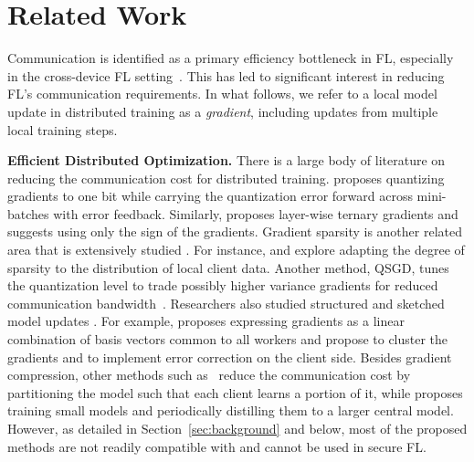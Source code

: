 \newcommand{\para}[1]{\noindent \textbf{#1}}

\section{Related Work}
\label{sec:related}

Communication is identified as a primary efficiency bottleneck in FL, especially in the cross-device FL setting~\cite{kairouz2019advances}.
This has led to significant interest in reducing FL's communication requirements. In what follows, we refer to a local model update in distributed training as a \emph{gradient}, including updates from multiple local training steps.

\para{Efficient Distributed Optimization.} There is a large body of literature on reducing the communication cost for distributed training. \cite{seide2014bit} proposes quantizing gradients to one bit while carrying the quantization error forward across mini-batches with error feedback. Similarly, \cite{wen2017terngrad} proposes layer-wise ternary gradients and \cite{bernstein2018signsgd} suggests using only the sign of the gradients. Gradient sparsity is another related area that is extensively studied \cite{wangni2017gradient,aji2017sparse,lin2017deep,renggli2018sparcml,parcollet2022zerofl}.
For instance, \cite{chen2017adacomp} and \cite{han2020adaptive} explore adapting the degree of sparsity to the distribution of local client data. Another method, QSGD, tunes the quantization level to trade possibly higher variance gradients for reduced communication bandwidth~\cite{alistarh2016qsgd}. Researchers also studied structured and sketched model updates \cite{konen2016federated}.
For example, \cite{wang2018atomo} proposes expressing gradients as a linear combination of basis vectors common to all workers and \cite{wang2022fedlite} propose to cluster the gradients and to implement error correction on the client side. Besides gradient compression, other methods such as~\cite{vepakomma2018split,hu2019dynamic} reduce the communication cost by partitioning the model such that each client learns a portion of it, while \cite{he2020group} proposes training small models and periodically distilling them to a larger central model. However, as detailed in Section~\ref{sec:background} and below, most of the proposed methods are not readily compatible with \SecAgg and cannot be used in secure FL.


